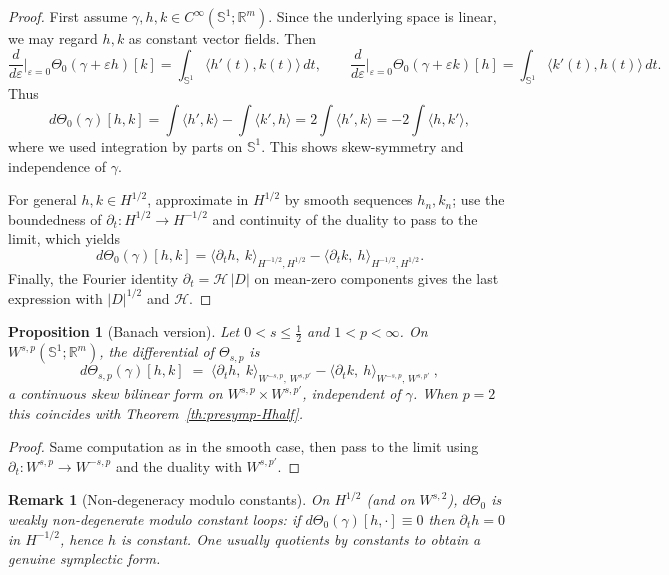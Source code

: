\documentclass{amsart}
\newcounter{thm}
\newcounter{ex}
\newcounter{re}
\newtheorem{proposition}[thm]{Proposition}
\newtheorem{remark}[thm]{Remark}
\begin{document}
\begin{proof}
First assume $\gamma,h,k\in C^\infty(\mathbb S^1;\mathbb R^m)$.
Since the underlying space is linear, we may regard $h,k$ as constant vector fields.
Then
\[
\frac{d}{d\varepsilon}\Big|_{\varepsilon=0}\Theta_0(\gamma+\varepsilon h)[k]
=\int_{\mathbb S^1}\!\langle h'(t),k(t)\rangle\,dt,\qquad
\frac{d}{d\varepsilon}\Big|_{\varepsilon=0}\Theta_0(\gamma+\varepsilon k)[h]
=\int_{\mathbb S^1}\!\langle k'(t),h(t)\rangle\,dt.
\]
Thus
\[
d\Theta_0(\gamma)[h,k]
=\int\langle h',k\rangle-\int\langle k',h\rangle
=2\int\langle h',k\rangle
=-2\int\langle h,k'\rangle,
\]
where we used integration by parts on $\mathbb S^1$.
This shows skew-symmetry and independence of $\gamma$.

For general $h,k\in H^{1/2}$, approximate in $H^{1/2}$ by smooth sequences
$h_n,k_n$; use the boundedness of $\partial_t:H^{1/2}\to H^{-1/2}$ and continuity of the
duality to pass to the limit, which yields
\[
d\Theta_0(\gamma)[h,k]
=\langle \partial_t h,\ k\rangle_{H^{-1/2},H^{1/2}}
-\langle \partial_t k,\ h\rangle_{H^{-1/2},H^{1/2}}.
\]
Finally, the Fourier identity $\partial_t=\mathcal H\,|D|$ on mean-zero components
gives the last expression with $|D|^{1/2}$ and $\mathcal H$.
\end{proof}

\begin{proposition}[Banach version]\label{cor:presymp-sp}
Let $0<s\le \tfrac12$ and $1<p<\infty$.
On $W^{s,p}(\mathbb S^1;\mathbb R^m)$, the differential of $\Theta_{s,p}$ is
\[
\boxed{\ d\Theta_{s,p}(\gamma)[h,k]\;=\;
\langle \partial_t h,\ k\rangle_{W^{-s,p},\,W^{s,p'}}
-\langle \partial_t k,\ h\rangle_{W^{-s,p},\,W^{s,p'}}\ ,\ }
\]
a continuous skew bilinear form on $W^{s,p}\times W^{s,p'}$,
independent of $\gamma$. When $p=2$ this coincides with Theorem~\ref{th:presymp-Hhalf}.
\end{proposition}

\begin{proof}
Same computation as in the smooth case, then pass to the limit using
$\partial_t:W^{s,p}\to W^{-s,p}$ and the duality with $W^{s,p'}$.
\end{proof}

\begin{remark}[Non-degeneracy modulo constants]
On $H^{1/2}$ (and on $W^{s,2}$), $d\Theta_0$ is weakly non-degenerate modulo constant loops:
if $d\Theta_0(\gamma)[h,\cdot]\equiv 0$ then $\partial_t h=0$ in $H^{-1/2}$,
hence $h$ is constant. One usually quotients by constants to obtain a genuine symplectic form.
\end{remark}
\end{document}
